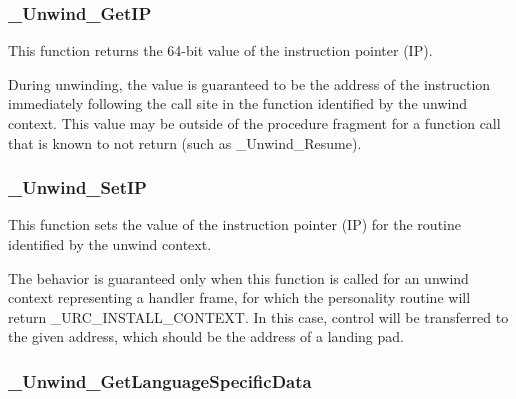 \subsubsection{\_Unwind\_GetIP}


This function returns the 64-bit value of the instruction pointer (IP). 

During unwinding, the value is guaranteed to be the address of the
instruction immediately following the call site in the function
identified by the unwind context. This value may be outside of the
procedure fragment for a function call that is known to not return
(such as \_Unwind\_Resume).

\subsubsection{\_Unwind\_SetIP}

This function sets the value of the instruction pointer (IP) for the 
routine identified by the unwind context. 

The behavior is guaranteed only when this function is called for an 
unwind context representing a handler frame, for which the personality
routine will return \_URC\_INSTALL\_CONTEXT. In this case, control will 
be transferred to the given address, which should be the address of a 
landing pad. 

\subsubsection{\_Unwind\_GetLanguageSpecificData}


